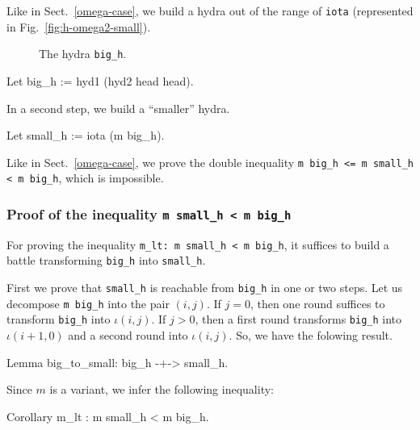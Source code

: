 Like in Sect.~\ref{omega-case}, we build a hydra out of the range of \texttt{iota} (represented in Fig.~\vref{fig:h-omega2-small}).

\begin{figure}[htb]
\centering
{}
\caption{\label{fig:h-omega2-small}}
 The hydra \texttt{big\_h}.
\end{figure}
\begin{Coqsrc}
   Let big_h := hyd1 (hyd2 head head).  
 \end{Coqsrc}
 
 In a second step, we build a ``smaller'' hydra.
 
\begin{Coqsrc}
   Let small_h := iota (m big_h).
\end{Coqsrc}

Like in Sect.~\ref{omega-case}, we prove the double inequality \texttt{m big\_h <= m small\_h < m big\_h}, which is impossible.

\subsubsection{Proof of the inequality \texttt{m small\_h < m big\_h}}

For proving the inequality  \texttt{m\_lt: m small\_h < m big\_h}, it suffices to
build a battle transforming \texttt{big\_h} into \texttt{small\_h}.

First we prove that \texttt{small\_h} is reachable from \texttt{big\_h} in one or two steps. Let us decompose \texttt{m big\_h}
into the pair $(i,j)$.
If $j=0$, then one round suffices to transform \texttt{big\_h} into $\iota(i,j)$.
If $j>0$, then a first round transforms \texttt{big\_h} into $\iota(i+1,0)$ and a second round into $\iota(i,j)$. So, we have the folowing result.

\begin{Coqsrc}
 Lemma big_to_small: big_h -+-> small_h.
\end{Coqsrc}

Since $m$ is a variant, we infer the following inequality:

\begin{Coqsrc}
Corollary m_lt : m small_h < m big_h.
\end{Coqsrc}


